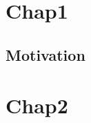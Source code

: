 \chapter{Chap1}
\label{cha:chap1}


\section{Motivation}
\label{sec:motivation}


\chapter{Chap2}
\label{cha:chap2}